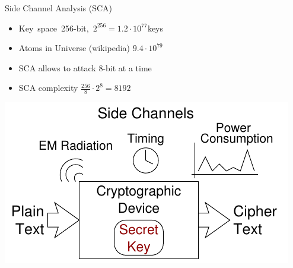 \documentclass[final]{beamer}
\begin{document}
\begin{frame}[fragile]{}
\begin{columns}[t]
\begin{column}{.31\linewidth}
\begin{block}{Side Channel Analysis (SCA)}
        \vspace{-2ex}
        \begin{minipage}[t]{0.62\linewidth}
          \begin{itemize}
            \item Key~space~256-bit,~$2^{256} = 1.2 \cdot 10^{77}$keys
            \item Atoms in Universe {\tiny(wikipedia)} $9.4 \cdot 10^{79}$
            \item SCA allows to attack 8-bit at a time
            \item SCA complexity $\frac{256}{8} \cdot 2^{8} = 8192$
          \end{itemize}
        \end{minipage}%
        \begin{minipage}[t]{0.38\linewidth}  
          \vspace{-1ex}%
          \hspace{-1ex}\includegraphics[width=\linewidth]{../figures/sidechannel2}
        \end{minipage}
        

\end{block}
\end{column}
\end{columns}
\end{frame}
\end{document}

